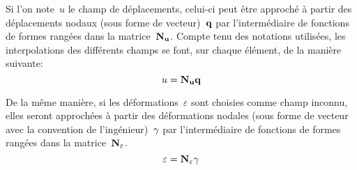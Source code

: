\medskip
{}

\medskip
Si l'on note~$u$ le champ de déplacements, celui-ci peut être approché à partir des déplacements nodaux (sous forme de vecteur)~$\VV{q}$ par l'intermédiaire de fonctions de formes rangées dans la matrice~$\MM{N_u}$. Compte tenu des notations utilisées, les interpolations des différents champs se font, sur chaque élément, de la manière suivante:
\begin{equation}
  u=\MM{N_u}\VV{q}
\end{equation}

De la même manière, si les déformations~$\varepsilon$ sont choisies comme champ inconnu, elles seront approchées à partir des déformations nodales (sous forme de vecteur avec la convention de l'ingénieur)~$\VV{\gamma}$ par l'intermédiaire de fonctions de formes rangées dans la matrice~$\MM{N_\varepsilon}$.
\begin{equation}
  \varepsilon = \MM{N_\varepsilon}\VV{\gamma}
\end{equation}

